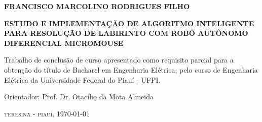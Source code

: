 \begin{center}
\textbf{\Large FRANCISCO MARCOLINO RODRIGUES FILHO}
\par
\vspace{4cm}
\textbf{\Large ESTUDO E IMPLEMENTAÇÃO DE ALGORITMO INTELIGENTE PARA RESOLUÇÃO DE LABIRINTO COM ROBÔ AUTÔNOMO DIFERENCIAL MICROMOUSE}
\end{center}
\par
\vspace{4cm}
\hspace*{160pt}\parbox{9cm}{{Trabalho de conclusão de curso apresentado como requisito parcial para a obtenção do título de Bacharel em Engenharia Elétrica, pelo curso de Engenharia Elétrica da Universidade Federal do Piauí - UFPI.}}
\vspace{2cm}
\par\hspace*{160pt}\parbox{10cm}{Orientador: Prof. Dr. Otacílio da Mota Almeida}
\vfill
\begin{center}
\textsc{\large teresina - piauí, \today}\\
\end{center}
\newpage

